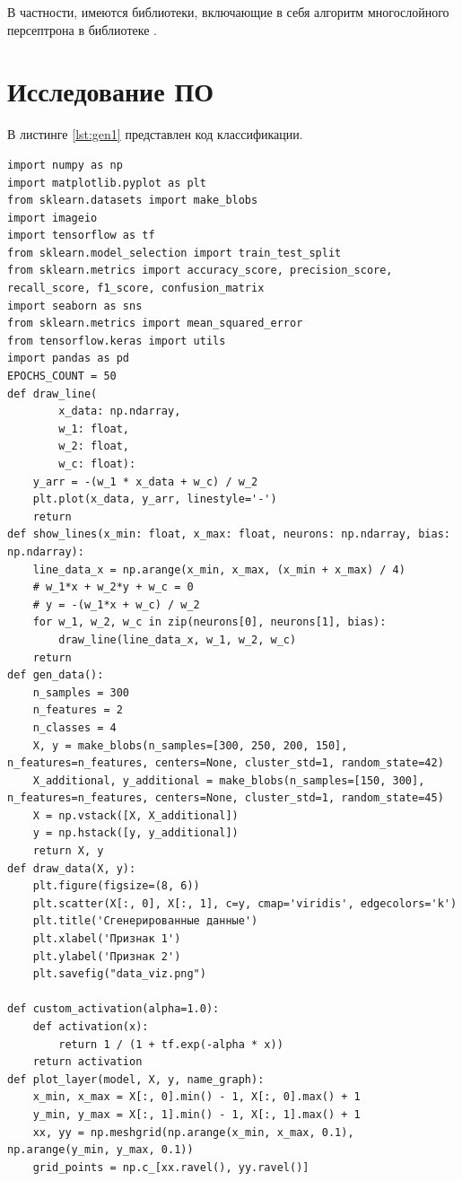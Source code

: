 \documentclass[12pt]{report}
\begin{document}
В частности, имеются библиотеки, включающие в себя алгоритм многослойного персептрона в библиотеке \cite{bib:scipy}.

\section{Исследование ПО}

В листинге \ref{lst:gen1} представлен код классификации.

\begin{lstlisting}[label=lst:gen1,caption=Код классификации]
import numpy as np
import matplotlib.pyplot as plt
from sklearn.datasets import make_blobs
import imageio
import tensorflow as tf
from sklearn.model_selection import train_test_split
from sklearn.metrics import accuracy_score, precision_score, recall_score, f1_score, confusion_matrix
import seaborn as sns
from sklearn.metrics import mean_squared_error
from tensorflow.keras import utils
import pandas as pd
EPOCHS_COUNT = 50
def draw_line(
        x_data: np.ndarray,
        w_1: float,
        w_2: float,
        w_c: float):
    y_arr = -(w_1 * x_data + w_c) / w_2
    plt.plot(x_data, y_arr, linestyle='-')
    return 
def show_lines(x_min: float, x_max: float, neurons: np.ndarray, bias: np.ndarray):
    line_data_x = np.arange(x_min, x_max, (x_min + x_max) / 4)
    # w_1*x + w_2*y + w_c = 0
    # y = -(w_1*x + w_c) / w_2
    for w_1, w_2, w_c in zip(neurons[0], neurons[1], bias):
        draw_line(line_data_x, w_1, w_2, w_c)
    return 
def gen_data():
    n_samples = 300
    n_features = 2
    n_classes = 4
    X, y = make_blobs(n_samples=[300, 250, 200, 150], n_features=n_features, centers=None, cluster_std=1, random_state=42)
    X_additional, y_additional = make_blobs(n_samples=[150, 300], n_features=n_features, centers=None, cluster_std=1, random_state=45)
    X = np.vstack([X, X_additional])
    y = np.hstack([y, y_additional])
    return X, y
def draw_data(X, y):
    plt.figure(figsize=(8, 6))
    plt.scatter(X[:, 0], X[:, 1], c=y, cmap='viridis', edgecolors='k')
    plt.title('Сгенерированные данные')
    plt.xlabel('Признак 1')
    plt.ylabel('Признак 2')
    plt.savefig("data_viz.png")
    
def custom_activation(alpha=1.0):
    def activation(x):
        return 1 / (1 + tf.exp(-alpha * x))
    return activation
def plot_layer(model, X, y, name_graph):
    x_min, x_max = X[:, 0].min() - 1, X[:, 0].max() + 1
    y_min, y_max = X[:, 1].min() - 1, X[:, 1].max() + 1
    xx, yy = np.meshgrid(np.arange(x_min, x_max, 0.1), np.arange(y_min, y_max, 0.1))
    grid_points = np.c_[xx.ravel(), yy.ravel()]
    

\end{lstlisting}
\end{document}
